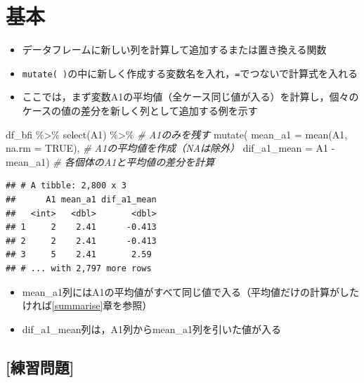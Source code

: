 \documentclass[
  xelatex,ja=standard, b5paper]{bxjsbook}
\newenvironment{Shaded}{\begin{snugshade}}{\end{snugshade}}
\newcommand{\AttributeTok}[1]{\textcolor[rgb]{0.77,0.63,0.00}{#1}}
\newcommand{\CommentTok}[1]{\textcolor[rgb]{0.56,0.35,0.01}{\textit{#1}}}
\newcommand{\ConstantTok}[1]{\textcolor[rgb]{0.00,0.00,0.00}{#1}}
\newcommand{\FunctionTok}[1]{\textcolor[rgb]{0.00,0.00,0.00}{#1}}
\newcommand{\NormalTok}[1]{#1}
\newcommand{\SpecialCharTok}[1]{\textcolor[rgb]{0.00,0.00,0.00}{#1}}
\providecommand{\tightlist}{%
  \setlength{\itemsep}{0pt}\setlength{\parskip}{0pt}}
\begin{document}
\hypertarget{mu-standard}{%
\section{基本}\label{mu-standard}}

\begin{itemize}
\tightlist
\item
  データフレームに新しい列を計算して追加するまたは置き換える関数
\item
  \texttt{mutate(\ )}の中に新しく作成する変数名を入れ，\texttt{=}でつないで計算式を入れる
\item
  ここでは，まず変数A1の平均値（全ケース同じ値が入る）を計算し，個々のケースの値の差分を新しく列として追加する例を示す
\end{itemize}

\begin{Shaded}
\begin{Highlighting}[]
\NormalTok{df\_bfi }\SpecialCharTok{\%\textgreater{}\%} 
  \FunctionTok{select}\NormalTok{(A1) }\SpecialCharTok{\%\textgreater{}\%}                      \CommentTok{\# A1のみを残す}
  \FunctionTok{mutate}\NormalTok{(}
    \AttributeTok{mean\_a1 =} \FunctionTok{mean}\NormalTok{(A1, }\AttributeTok{na.rm =} \ConstantTok{TRUE}\NormalTok{), }\CommentTok{\# A1の平均値を作成（NAは除外）}
    \AttributeTok{dif\_a1\_mean =}\NormalTok{ A1 }\SpecialCharTok{{-}}\NormalTok{ mean\_a1)       }\CommentTok{\# 各個体のA1と平均値の差分を計算}
\end{Highlighting}
\end{Shaded}

\begin{verbatim}
## # A tibble: 2,800 x 3
##      A1 mean_a1 dif_a1_mean
##   <int>   <dbl>       <dbl>
## 1     2    2.41      -0.413
## 2     2    2.41      -0.413
## 3     5    2.41       2.59 
## # ... with 2,797 more rows
\end{verbatim}

\begin{itemize}
\tightlist
\item
  mean\_a1列にはA1の平均値がすべて同じ値で入る（平均値だけの計算がしたければ\ref{summarise}章を参照）
\item
  dif\_a1\_mean列は，A1列からmean\_a1列を引いた値が入る
\end{itemize}

\hypertarget{ux7df4ux7fd2ux554fux984c-9}{%
\subsection{{[}練習問題{]}}\label{ux7df4ux7fd2ux554fux984c-9}}
\end{document}
